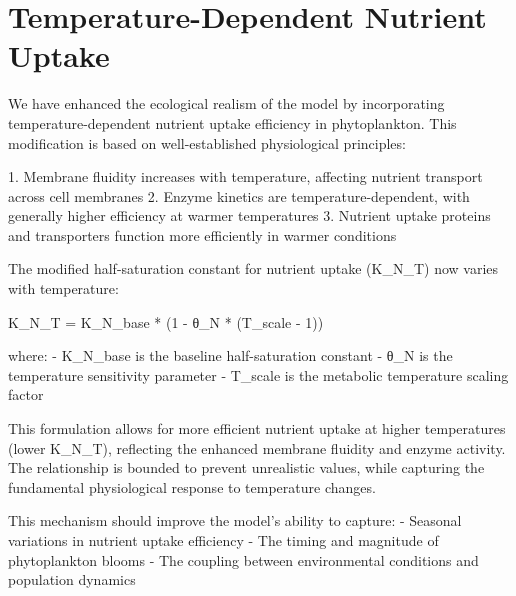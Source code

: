 \section{Temperature-Dependent Nutrient Uptake}

We have enhanced the ecological realism of the model by incorporating temperature-dependent nutrient uptake efficiency in phytoplankton. This modification is based on well-established physiological principles:

1. Membrane fluidity increases with temperature, affecting nutrient transport across cell membranes
2. Enzyme kinetics are temperature-dependent, with generally higher efficiency at warmer temperatures
3. Nutrient uptake proteins and transporters function more efficiently in warmer conditions

The modified half-saturation constant for nutrient uptake (K_N_T) now varies with temperature:

K_N_T = K_N_base * (1 - θ_N * (T_scale - 1))

where:
- K_N_base is the baseline half-saturation constant
- θ_N is the temperature sensitivity parameter
- T_scale is the metabolic temperature scaling factor

This formulation allows for more efficient nutrient uptake at higher temperatures (lower K_N_T), reflecting the enhanced membrane fluidity and enzyme activity. The relationship is bounded to prevent unrealistic values, while capturing the fundamental physiological response to temperature changes.

This mechanism should improve the model's ability to capture:
- Seasonal variations in nutrient uptake efficiency
- The timing and magnitude of phytoplankton blooms
- The coupling between environmental conditions and population dynamics
